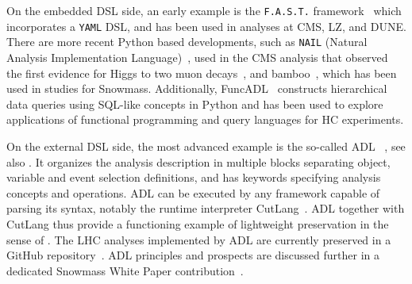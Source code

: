 \documentclass[11pt]{article}
\begin{document}
On the embedded \gls{DSL} side, an early example is the \texttt{F.A.S.T.} framework~\cite{FAST} which incorporates a \texttt{YAML} \gls{DSL}, and has been used in analyses at CMS, \gls{LZ}, and \gls{DUNE}.
There are more recent Python based developments, such as \texttt{NAIL} (Natural Analysis Implementation Language)~\cite{NAIL}, used in the CMS analysis that observed the first evidence for Higgs to two muon decays~\cite{CMS:2020xwi}, and bamboo~\cite{David:2021ohq}, which has been used in studies for Snowmass.
Additionally, FuncADL~\cite{Proffitt:2021wfh} constructs hierarchical data queries using SQL-like concepts in Python and has been used to explore applications of functional programming and query languages for HC experiments.

On the external \gls{DSL} side, the most advanced example is the so-called \gls{ADL}%
~\cite{adlweb, Unel:2021edl}, see also \cite{LHCReinterpretationForum:2020xtr}. 
It organizes the analysis description in multiple blocks separating object, variable and event selection definitions, and has keywords specifying analysis concepts and operations. 
\gls{ADL} can be executed by any framework capable of parsing its syntax, notably the runtime interpreter CutLang~\cite{Sekmen:2018ehb}. \gls{ADL} together with CutLang thus provide a functioning example of lightweight preservation in the sense of . 
The \gls{LHC} analyses implemented by \gls{ADL} are currently preserved in a GitHub repository~\cite{adllhcanl}.  \gls{ADL} principles and prospects are discussed further in a dedicated Snowmass White Paper contribution~\cite{snowmass:ADL}.
\end{document}
